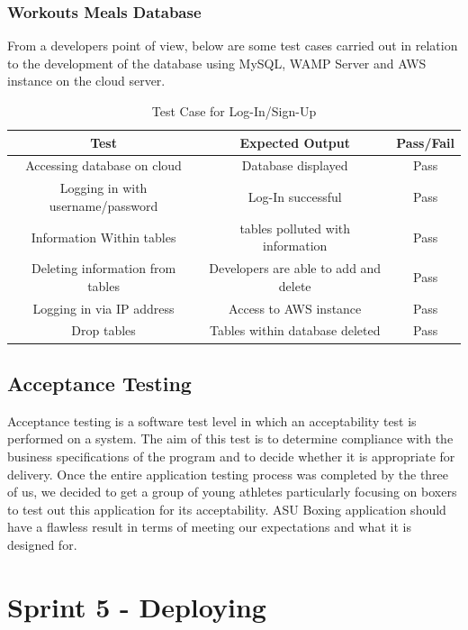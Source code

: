 \documentclass[a4paper,12pt]{report}
\begin{document}
\subsubsection{Workouts Meals Database}
From a developers point of view, below are some test cases carried out in relation to the development of the database using MySQL, WAMP Server and AWS instance on the cloud server.

\begin{table}[h]
    \centering
    \begin{tabular}{||c c c||} 
     \hline
     \textbf{Test} & \textbf{Expected Output} & \textbf{Pass/Fail} \\ [0.5ex] 
     \hline\hline
     Accessing database on cloud  & Database displayed & Pass \\ 
     \hline
     Logging in with username/password & Log-In successful & Pass \\  
     \hline
     Information Within tables & tables polluted with information & Pass \\
     \hline
     Deleting information from tables & Developers are able to add and delete  & Pass \\
     \hline
     Logging in via IP address & Access to AWS instance & Pass \\
     \hline
     Drop tables & Tables within database deleted & Pass \\
     \hline
    \end{tabular}
    \caption{Test Case for Log-In/Sign-Up}
    \label{tab:LogInTest}
\end{table}

\subsection{Acceptance Testing}
Acceptance testing is a software test level in which an acceptability test is performed on a system. The aim of this test is to determine compliance with the business specifications of the program and to decide whether it is appropriate for delivery. Once the entire application testing process was completed by the three of us, we decided to get a group of young athletes particularly focusing on boxers to test out this application for its acceptability. ASU Boxing application should have a flawless result in terms of meeting our expectations and what it is designed for.
\newpage
\section{Sprint 5 - Deploying}
\end{document}
